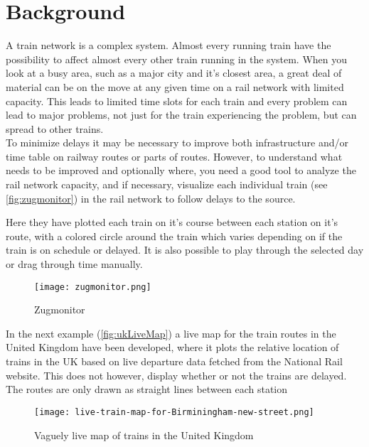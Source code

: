 
\chapter{Background}



A train network is a complex system. Almost every running train have the 
possibility to affect almost every other train running in the system.  When you look at a busy area, such as a major city and it's closest
area, a great deal of material can be on the move at any given time on a
rail network with limited capacity. This leads to limited time slots for each train and every
problem can lead to major problems, not just for the train experiencing the
problem, but can spread to other trains. \\

To minimize delays it may be necessary to improve both infrastructure and/or
time table on railway routes or parts of routes. However, to understand what
needs to be improved and optionally where, you need a good tool to analyze the
rail network capacity, and if necessary, visualize each individual train (see 
\vref{fig:zugmonitor}) in the rail network to follow delays to the source.

Here they have plotted each train on it's course between each station on it's
route, with a colored circle around the train which varies depending on if the
train is on schedule or delayed. It is also possible to play through the
selected day or drag through time manually.\\

\begin{figure}[!htbp]
	\texttt{[image: zugmonitor.png]}
	\caption[Zugmonitor]{Zugmonitor \cite{zugmonitor}}
	\label{fig:zugmonitor}
\end{figure}

In the next example (\vref{fig:ukLiveMap}) a live map for the train 
routes in the United Kingdom have been developed, where it plots the relative 
location of trains in the UK based on live departure data fetched from the 
National Rail website. This does not however, display whether or not the 
trains are delayed. The routes are only drawn as straight lines between each 
station

\begin{figure}[!htbp]
	\texttt{[image: live-train-map-for-Birminingham-new-street.png]}
	\caption[Vaguely live map of trains in the United Kingdom]{Vaguely live map of trains in the United Kingdom \cite{ukLiveMap}}
	\label{fig:ukLiveMap}
\end{figure}

